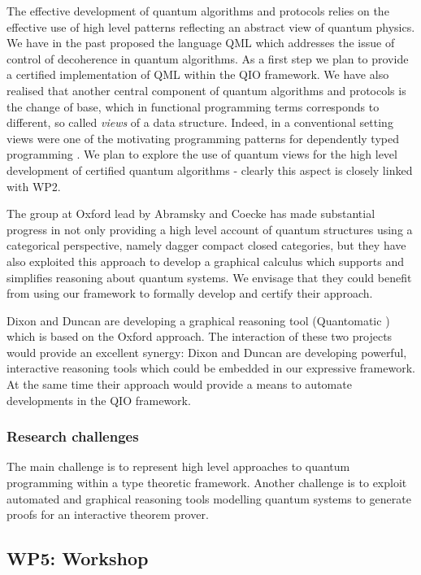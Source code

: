 \documentclass[a4paper]{article}
\begin{document}
The effective development of quantum algorithms and protocols relies
on the effective use of high level patterns reflecting an abstract
view of quantum physics. We have in the past proposed the language QML
which addresses the issue of control of decoherence in quantum
algorithms. As a first step we plan to provide a certified
implementation of QML within the QIO framework. We have also realised
that another central component of quantum algorithms and protocols is
the change of base, which in functional programming terms corresponds
to different, so called \emph{views} of a data structure. Indeed, in a
conventional setting views were one of the motivating programming
patterns for dependently typed programming . We plan to
explore the use of quantum views for the high level development of
certified quantum algorithms - clearly this aspect is closely linked
with WP2. 

The group at Oxford lead by Abramsky and Coecke has made substantial
progress in not only providing a high level account of quantum
structures using a categorical perspective, namely dagger compact
closed categories, but they have also exploited this approach to
develop a graphical calculus which supports and simplifies reasoning
about quantum systems. We envisage that they could benefit from using
our framework to formally develop and certify their approach.

Dixon and Duncan are developing a graphical reasoning tool
(Quantomatic ) which is based on the Oxford approach. 
The interaction
of these two projects would provide an excellent synergy: Dixon and
Duncan are developing powerful, interactive reasoning tools which could
be embedded in our expressive framework. At the same time their
approach would provide a means to automate developments in the QIO
framework. 

\subsubsection*{Research challenges}

The main challenge is to represent high level approaches to quantum
programming within a type theoretic framework. Another challenge is to
exploit automated and graphical reasoning tools modelling quantum
systems to generate proofs for an interactive theorem prover. 

\subsection*{WP5: Workshop}
\label{sec:wp5:-summerschool}
\end{document}
